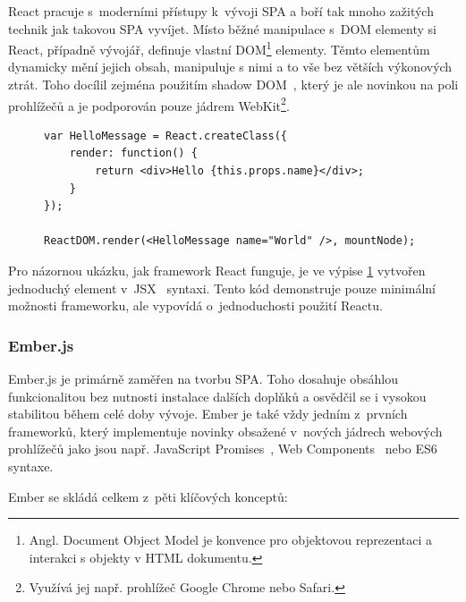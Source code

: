 React pracuje s~moderními přístupy k~vývoji SPA a boří tak mnoho zažitých technik jak takovou SPA vyvíjet. Místo běžné manipulace s~DOM elementy si React, případně vývojář, definuje vlastní DOM\footnote{Angl. Document Object Model je konvence pro objektovou reprezentaci a interakci s objekty v HTML dokumentu.} elementy. Těmto elementům dynamicky mění jejich obsah, manipuluje s nimi a to vše bez větších výkonových ztrát. Toho docílil zejména použitím shadow DOM~\cite{shadowdom}, který je ale novinkou na poli prohlížečů a je podporován pouze jádrem WebKit\footnote{Využívá jej např. prohlížeč Google Chrome nebo Safari.}. 


\begin{figure}[ht]
\lstset{basicstyle=\small,style=JSON}
\begin{lstlisting}
var HelloMessage = React.createClass({
    render: function() {
        return <div>Hello {this.props.name}</div>;
    }
});

ReactDOM.render(<HelloMessage name="World" />, mountNode);
\end{lstlisting}
\label{code:react}
\end{figure}

Pro názornou ukázku, jak framework React funguje, je ve výpise \ref{code:react} vytvořen jednoduchý  element v~JSX~\cite{jsx} syntaxi. Tento kód demonstruje pouze minimální možnosti frameworku, ale vypovídá o~jednoduchosti použití Reactu.

\subsubsection*{Ember.js}

Ember.js je primárně zaměřen na tvorbu SPA. Toho dosahuje obsáhlou funkcionalitou bez nutnosti instalace dalších doplňků a osvědčil se i vysokou stabilitou během celé doby vývoje. Ember je také vždy jedním z~prvních frameworků, který implementuje novinky obsažené v~nových jádrech webových prohlížečů jako jsou např. JavaScript Promises~\cite{jspromises}, Web Components~\cite{webcomponents} nebo ES6 syntaxe.

Ember se skládá celkem z~pěti klíčových konceptů:

